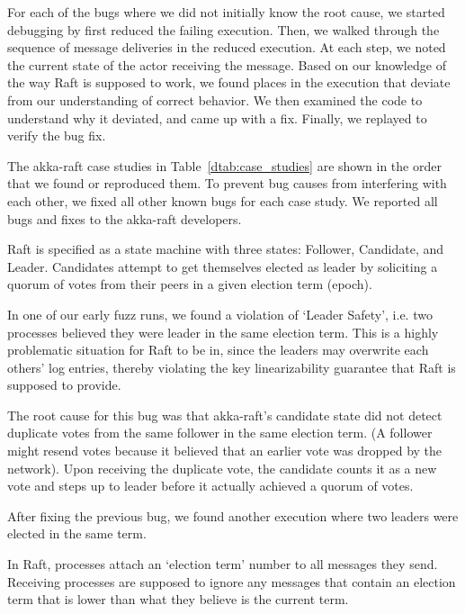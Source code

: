 For each of the bugs where we did not initially know the root cause, we
started debugging by first reduced the failing execution. Then,
we walked through the sequence of message deliveries in the
reduced execution. At each step,
we noted the current state of the actor receiving the message. Based on
our knowledge of the way Raft is supposed to work, we found places in
the execution that deviate from our understanding of correct behavior.
We then examined the code to understand why it deviated, and came up
with a fix. Finally, we replayed to verify the bug fix.

The akka-raft case studies in Table~\ref{dtab:case_studies} are shown in the
order that we found or reproduced them. To prevent bug causes from interfering
with
each other, we fixed all other known bugs for each case study. We reported all bugs and fixes to the akka-raft
developers.

 Raft is specified as a state machine with three
 states: Follower, Candidate, and Leader. Candidates attempt to
 get themselves elected as leader by soliciting a quorum of
 votes from their peers in a given election term (epoch).

In one of our early fuzz runs, we found a violation of `Leader Safety',
 i.e. two processes believed they were leader in the same election term.
 This is a highly problematic situation for Raft to be in, since the leaders may overwrite each
 others' log entries, thereby violating the key linearizability guarantee that
 Raft is supposed to provide.

The root cause for this bug was that akka-raft's candidate
 state did not detect duplicate votes from the same follower
 in the same election term. (A follower might resend votes because it
 believed that an earlier vote was dropped by the network).
 Upon receiving the duplicate vote, the candidate counts it as a new vote and steps
 up to leader before it actually achieved a quorum of votes.

 After fixing the previous bug, we found another
 execution where two leaders were elected in the same term.

In Raft, processes attach an `election term' number to all messages they send.
 Receiving processes are supposed to ignore any messages that contain an election
 term that is lower than what they believe is the current term.

